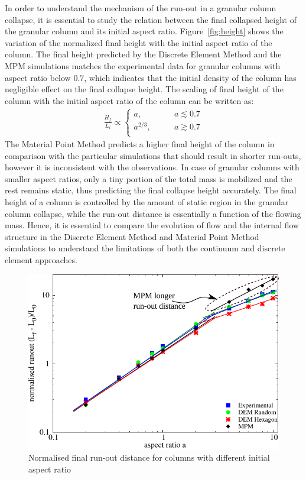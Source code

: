In order to understand the mechanism of the run-out in a granular column 
collapse, it is essential to study the relation between the final collapsed 
height of the granular column and its initial aspect ratio. 
Figure~\ref{fig:height} shows the variation of the normalized final height with 
the initial aspect ratio of the column. The final height predicted by the 
Discrete Element Method and the MPM simulations matches the experimental data 
for 
granular columns with aspect ratio below 0.7, which indicates that the initial 
density of the column has negligible effect on the final collapse height. The 
scaling of final height of the column with the initial aspect ratio of the 
column can be written as:
\begin{align}
\frac{H_{\textit{f}}}{L_{\textit{i}}} \propto  
\begin{cases}
\textit{a}, \qquad & \textit{a}\lesssim0.7 \\
\textit{a}^{2/3}, \qquad & \textit{a}\gtrsim0.7 \\
\end{cases}
\end{align}
The Material Point Method predicts a higher final height of the column in 
comparison with the particular simulations that should result in shorter 
run-outs, however it is inconsistent with the observations. In case of granular 
columns with smaller aspect ratios, only a tiny portion of the total mass is 
mobilized and the rest remains static, thus predicting the final collapse 
height accurately. The final height of a column is controlled by the amount of 
static region in the granular column collapse, while the run-out distance is 
essentially a function of the flowing mass. Hence, it is essential to compare 
the evolution of flow and the internal flow structure in the Discrete Element 
Method 
and Material Point Method simulations to understand the limitations of both the 
continuum and discrete element approaches.

\begin{figure}[tbhp]
\centering
\includegraphics[width=\textwidth]{runout}
\caption{Normalised final run-out distance for columns with different initial 
aspect ratio}
\label{fig:run-out}
\end{figure}

